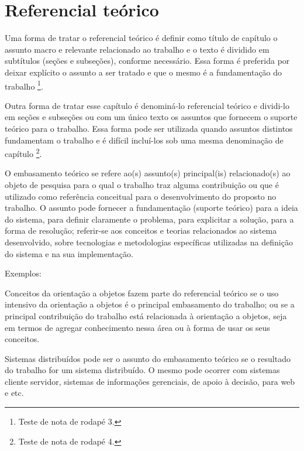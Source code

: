 \chapter{Referencial te\'orico}\label{cap:referencialTeorico}

Uma forma de tratar o referencial teórico é definir como título de capítulo o assunto macro e relevante relacionado ao trabalho e o texto é dividido em subtítulos (seções e subseções), conforme necessário. Essa forma é preferida por deixar explícito o assunto a ser tratado e que o mesmo é a fundamentação do trabalho \footnote{Teste de nota de rodapé 3.}. 

Outra forma de tratar esse capítulo é denominá-lo referencial teórico e dividi-lo em seções e subseções ou com um único texto os assuntos que fornecem o suporte teórico para o trabalho. Essa forma pode ser utilizada quando assuntos distintos fundamentam o trabalho e é difícil incluí-los sob uma mesma denominação de capítulo \footnote{Teste de nota de rodapé 4.}.

O embasamento teórico se refere ao(s) assunto(s) principal(is) relacionado(s) ao objeto de pesquisa para o qual o trabalho traz alguma contribuição ou que é utilizado como referência conceitual para o desenvolvimento do proposto no trabalho. O assunto pode fornecer a fundamentação (suporte teórico) para a ideia do sistema, para definir claramente o problema, para explicitar a solução, para a forma de resolução; referir-se aos conceitos e teorias relacionados ao sistema desenvolvido, sobre tecnologias e metodologias específicas utilizadas na definição do sistema e na sua implementação.

Exemplos:

Conceitos da orientação a objetos fazem parte do referencial teórico se o uso intensivo da orientação a objetos é o principal embasamento do trabalho; ou se a principal contribuição do trabalho está relacionada à orientação a objetos, seja em termos de agregar conhecimento nessa área ou à forma de usar os seus conceitos.

Sistemas distribuídos pode ser o assunto do embasamento teórico se o resultado do trabalho for um sistema distribuído. O mesmo pode ocorrer com sistemas cliente servidor, sistemas de informações gerenciais, de apoio à decisão, para web e etc.

